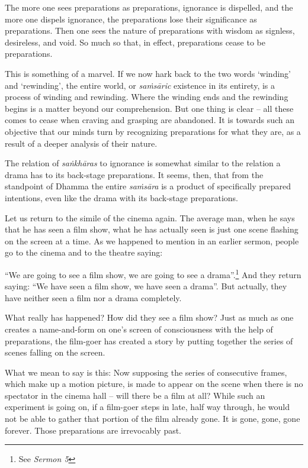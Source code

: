 The more one sees preparations as preparations, ignorance is dispelled, and the more one dispels ignorance, the preparations lose their significance as preparations. Then one sees the nature of preparations with wisdom as signless, desireless, and void. So much so that, in effect, preparations cease to be preparations.

This is something of a marvel. If we now hark back to the two words `winding' and `rewinding', the entire world, or \emph{saṁsāric} existence in its entirety, is a process of winding and rewinding. Where the winding ends and the rewinding begins is a matter beyond our comprehension. But one thing is clear -- all these comes to cease when craving and grasping are abandoned. It is towards such an objective that our minds turn by recognizing preparations for what they are, as a result of a deeper analysis of their nature.

The relation of \emph{saṅkhāras} to ignorance is somewhat similar to the relation a drama has to its back-stage preparations. It seems, then, that from the standpoint of Dhamma the entire \emph{saṁsāra} is a product of specifically prepared intentions, even like the drama with its back-stage preparations.

Let us return to the simile of the cinema again. The average man, when he says that he has seen a film show, what he has actually seen is just one scene flashing on the screen at a time. As we happened to mention in an earlier sermon, people go to the cinema and to the theatre saying:

``We are going to see a film show, we are going to see a drama''.\footnote{See \emph{Sermon 5}} And they return saying: ``We have seen a film show, we have seen a drama''. But actually, they have neither seen a film nor a drama completely.

What really has happened? How did they see a film show? Just as much as one creates a name-and-form on one's screen of consciousness with the help of preparations, the film-goer has created a story by putting together the series of scenes falling on the screen.

What we mean to say is this: Now supposing the series of consecutive frames, which make up a motion picture, is made to appear on the scene when there is no spectator in the cinema hall -- will there be a film at all? While such an experiment is going on, if a film-goer steps in late, half way through, he would not be able to gather that portion of the film already gone. It is gone, gone, gone forever. Those preparations are irrevocably past.

